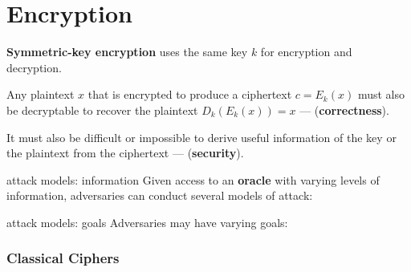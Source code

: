 \part{Encryption}

\textbf{Symmetric-key encryption} uses the same key $k$ for encryption and decryption.

Any plaintext $x$ that is encrypted to produce a ciphertext $c = E_k(x)$ must also be decryptable to recover the plaintext $D_k(E_k(x)) = x$ --- (\textbf{correctness}).

It must also be difficult or impossible to derive useful information of the key or the plaintext from the ciphertext --- (\textbf{security}).

\begin{defn}{attack models: information}
    Given access to an \textbf{oracle} with varying levels of information, adversaries can conduct several models of attack:

    \begin{itemize}
    \end{itemize}
\end{defn}

\begin{defn}{attack models: goals}
    Adversaries may have varying goals:
    \begin{itemize}
    \end{itemize}
\end{defn}

\section{Classical Ciphers}

